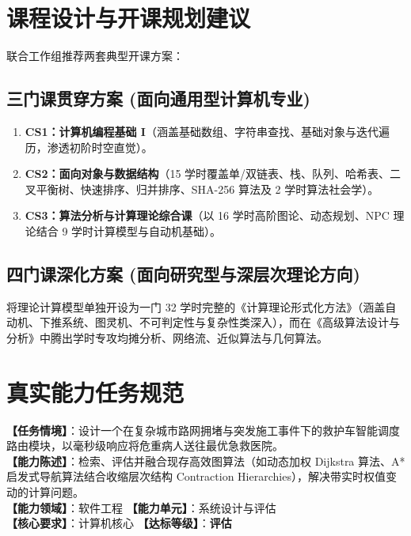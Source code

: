 \section{课程设计与开课规划建议}

联合工作组推荐两套典型开课方案：

\subsection{三门课贯穿方案 (面向通用型计算机专业)}
\begin{enumerate}
    \item \textbf{CS1：计算机编程基础 I}（涵盖基础数组、字符串查找、基础对象与迭代遍历，渗透初阶时空直觉）。
    \item \textbf{CS2：面向对象与数据结构}（15 学时覆盖单/双链表、栈、队列、哈希表、二叉平衡树、快速排序、归并排序、SHA-256 算法及 2 学时算法社会学）。
    \item \textbf{CS3：算法分析与计算理论综合课}（以 16 学时高阶图论、动态规划、NPC 理论结合 9 学时计算模型与自动机基础）。
\end{enumerate}

\subsection{四门课深化方案 (面向研究型与深层次理论方向)}
将理论计算模型单独开设为一门 32 学时完整的《计算理论形式化方法》（涵盖自动机、下推系统、图灵机、不可判定性与复杂性类深入），而在《高级算法设计与分析》中腾出学时专攻均摊分析、网络流、近似算法与几何算法。

\section{真实能力任务规范}

\begin{taskbox}[任务 1：急救车辆智能紧急调度路由系统]
\textbf{【任务情境】}：设计一个在复杂城市路网拥堵与突发施工事件下的救护车智能调度路由模块，以毫秒级响应将危重病人送往最优急救医院。\\
\textbf{【能力陈述】}：检索、评估并融合现存高效图算法（如动态加权 Dijkstra 算法、A* 启发式导航算法结合收缩层次结构 Contraction Hierarchies），解决带实时权值变动的计算问题。\\
\textbf{【能力领域】}：软件工程 \quad \textbf{【能力单元】}：系统设计与评估\\
\textbf{【核心要求】}：计算机核心 \quad \textbf{【达标等级】}：\textbf{评估}
\end{taskbox}

